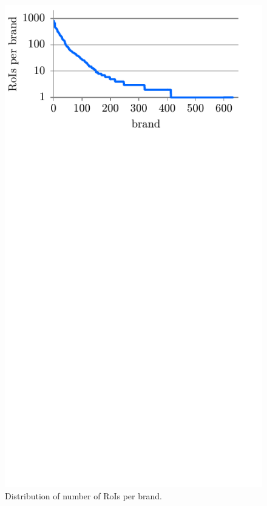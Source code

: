 \documentclass[a4paper,twoside]{article}
\begin{document}
%
\begin{figure}%
\centering%
\includegraphics[width=\linewidth, trim=0cm 11cm 0cm 0cm, clip]{img/brandDistribution.pdf}%
\caption{Distribution of number of RoIs per brand.}%
\label{fig:brandDistribution}
\end{figure}%
%
\end{document}

